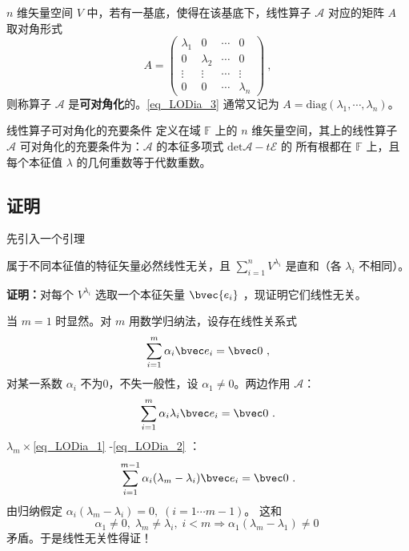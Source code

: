 \begin{definition}{}
 $n$ 维矢量空间 $V$ 中，若有一基底，使得在该基底下，线性算子 $\mathcal{A}$ 对应的矩阵 $A$ 取对角形式
 \begin{equation}\label{eq_LODia_3}
 A=\begin{pmatrix}
 \lambda_1&0&\cdots&0\\
 0&\lambda_2&\cdots&0\\
 \vdots&\vdots&\cdots&\vdots\\
 0&0&\cdots&\lambda_n
 \end{pmatrix}~,
 \end{equation}
 则称算子 $\mathcal{A}$ 是\textbf{可对角化}的。\autoref{eq_LODia_3} 通常又记为 $A=\mathrm{diag}(\lambda_1,\cdots,\lambda_n)$。
\end{definition}
\begin{theorem}{线性算子可对角化的充要条件}\label{the_LODia_1}
定义在域 $\mathbb{F}$ 上的 $n$ 维矢量空间，其上的线性算子 $\mathcal{A}$ 可对角化的充要条件为：$\mathcal{A}$ 的本征多项式 $\mathrm{det}{\mathcal{A}-t \mathcal{E}}$ 的 所有根都在 $\mathbb{F}$ 上，且每个本征值 $\lambda$ 的几何重数等于代数重数。
\end{theorem}
\subsection{证明}
先引入一个引理
\begin{lemma}{}\label{lem_LODia_1}
属于不同本征值的特征矢量必然线性无关，且 $\sum\limits_{i=1}^nV^{\lambda_i}$ 是直和（各 $\lambda_i$ 不相同）。
\end{lemma}
\textbf{证明：}对每个 $V^{\lambda_i}$ 选取一个本征矢量 $\bvec{e_i}$ ，现证明它们线性无关。

当 $m=1$ 时显然。对 $m$ 用数学归纳法，设存在线性关系式
\begin{equation}\label{eq_LODia_1}
\sum_{i=1}^{m}\alpha_i\bvec e_i=\bvec 0~,
\end{equation}
对某一系数 $\alpha_i$ 不为0，不失一般性，设 $\alpha_1\neq0$。两边作用 $\mathcal A$：
\begin{equation}\label{eq_LODia_2}
\sum_{i=1}^m\alpha_i\lambda_i\bvec e_i=\bvec 0~.
\end{equation}
$\lambda_m\times$\autoref{eq_LODia_1} -\autoref{eq_LODia_2} ：
\begin{equation}
\sum_{i=1}^{m-1}\alpha_i(\lambda_m-\lambda_i)\bvec e_i=\bvec 0~.
\end{equation}
由归纳假定 $\alpha_i(\lambda_m-\lambda_i)=0,\;(i=1\cdots m-1)$。 这和
\begin{equation}
\alpha_1\ne0,\;\lambda_m\neq\lambda_i,\;i<m\Rightarrow \alpha_1(\lambda
_m-\lambda_1)\neq0~
\end{equation}
矛盾。于是线性无关性得证！

